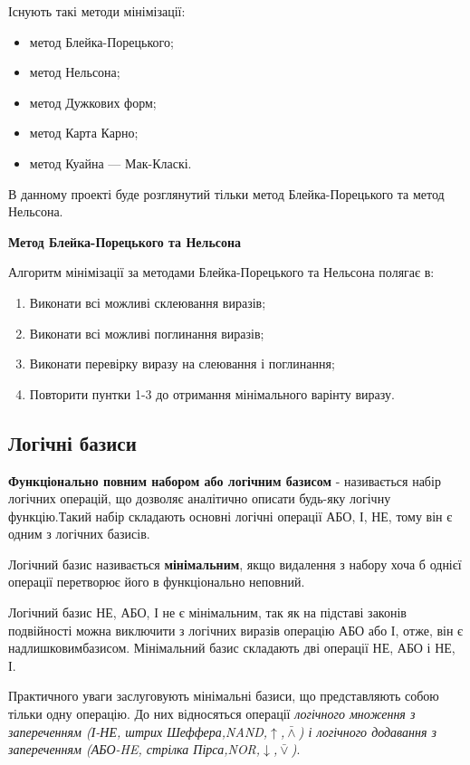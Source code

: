 Існують такі методи мінімізації:
\begin{itemize}
	\item метод Блейка-Порецького;
	\item метод Нельсона;
	\item метод Дужкових форм;
	\item метод Карта Карно;
	\item метод Куайна — Мак-Класкі.
\end{itemize}

В данному проекті буде розглянутий тільки метод Блейка-Порецького та метод Нельсона.

\textbf{Метод Блейка-Порецького та Нельсона}

Алгоритм мінімізації за методами Блейка-Порецького та Нельсона полягає в:
\begin{enumerate}
\item Виконати всі можливі склеювання виразів;
\item Виконати всі можливі поглинання виразів;
\item Виконати перевірку виразу на слеювання і поглинання;
\item Повторити пунтки 1-3 до отримання мінімального варінту виразу.
\end{enumerate}

\newpage
\subsection{Логічні базиси}\label{subsect:logic_basis}
\textbf{Функціонально повним набором або логічним базисом} - називається набір логічних операцій, що дозволяє аналітично описати будь-яку логічну функцію.Такий набір складають основні логічні операції АБО, І, НЕ, тому він є одним з логічних базисів.

Логічний базис називається \textbf{мінімальним}, якщо видалення з набору хоча б однієї операції перетворює його в функціонально неповний.

 Логічний базис НЕ, АБО, І не є мінімальним, так як на підставі законів подвійності можна виключити з логічних виразів операцію АБО або І, отже, він є надлишковимбазисом. Мінімальний базис складають дві операції НЕ, АБО і НЕ, І. 
 
Практичного уваги заслуговують мінімальні базиси, що представляють собою тільки одну операцію. До них відносяться операції \emph{логічного множення з запереченням (І-НЕ, штрих Шеффера,NAND,$\uparrow$,$\bar{\wedge}$) і логічного додавання з запереченням (АБО-HE, стрілка Пірса,NOR,$\downarrow$,$\bar{\vee}$)}.


